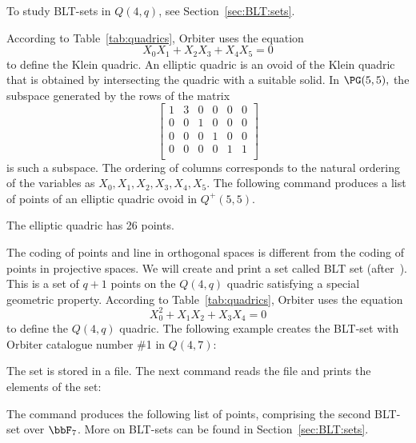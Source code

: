 \bigskip



\bigskip

To study BLT-sets in $Q(4,q)$, see Section~\ref{sec:BLT:sets}.

\bigskip


According to Table~\ref{tab:quadrics}, 
Orbiter uses the equation 
$$
X_0X_1+
X_2X_3+
X_4X_5 = 0
$$
to define the Klein quadric.
An elliptic quadric is an ovoid of the Klein quadric that is 
obtained by intersecting the quadric with a suitable solid.
In $\PG(5,5),$
the subspace generated by the rows of the matrix
$$
\left[
\begin{array}{cccccc}
1&3&0&0&0&0 \\
0&0&1&0&0&0 \\
0&0&0&1&0&0 \\
0&0&0&0&1&1 \\
\end{array}
\right]
$$
is such a subspace.
The ordering of columns corresponds to the natural 
ordering of the variables as $X_0, X_1, X_2, X_3, X_4, X_5.$
The following command produces a list 
of points of an elliptic quadric ovoid in $Q^+(5,5).$


The elliptic quadric has 26 points.


\bigskip


The coding of points and line in orthogonal spaces 
is different from the coding of points in projective spaces. 
We will create and print a set called BLT set 
(after~\cite{BaderLunardonThas90}). 
This is a set of $q+1$ points on the $Q(4,q)$ 
quadric satisfying a special geometric property. 
According to Table~\ref{tab:quadrics}, Orbiter uses the equation 
$$
X_0^2+
X_1X_2+
X_3X_4 = 0
$$
to define the $Q(4,q)$ quadric.
The following example creates the BLT-set with Orbiter catalogue number \#1 in $Q(4,7)$:


The set is stored in a file.
The next command reads the file and prints the elements of the set:


The command produces the following list of points, 
comprising the second BLT-set over $\bbF_7$.
More on BLT-sets can be found in Section~\ref{sec:BLT:sets}.

\bigskip

